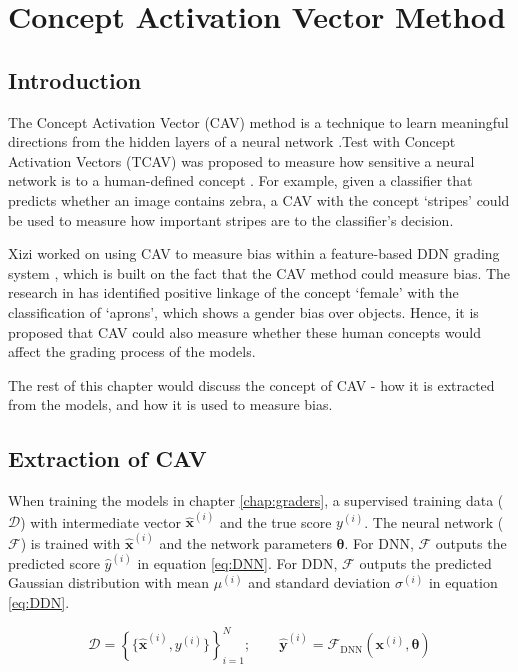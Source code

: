 \chapter{Concept Activation Vector Method} \label{chap:cav}

\section{Introduction}
The Concept Activation Vector (CAV) method is a technique to learn meaningful directions from the hidden layers of a neural network \cite{cav_def}.Test with Concept Activation Vectors (TCAV)  was proposed to measure how sensitive a neural network is to a human-defined concept \cite{tcav}. For example, given a classifier that predicts whether an image contains zebra, a CAV with the concept `stripes' could be used to measure how important stripes are to the classifier's decision.

Xizi worked on using CAV to measure bias within a feature-based DDN grading system \cite{feature_bias}, which is built on the fact that the CAV method could measure bias. The research in \cite{tcav} has identified positive linkage of the concept `female' with the classification of `aprons', which shows a gender bias over objects. Hence, it is proposed that CAV could also measure whether these human concepts would affect the grading process of the models.

The rest of this chapter would discuss the concept of CAV - how it is extracted from the models, and how it is used to measure bias.

\section{Extraction of CAV} \label{sec:cav_extraction}
When training the models in chapter \ref{chap:graders}, a supervised training data ($\mathcal{D}$) with intermediate vector $\mathbf{\hat{x}}^{(i)}$ and the true score $y^{(i)}$. The neural network ($\mathcal{F}$) is trained with $\mathbf{\hat{x}}^{(i)}$ and the network parameters $\boldsymbol{\theta}$. For DNN, $\mathcal{F}$ outputs the predicted score $\hat{y}^{(i)}$ in equation \ref{eq:DNN}. For DDN, $\mathcal{F}$ outputs the predicted Gaussian distribution with mean $\mu^{(i)}$ and standard deviation $\sigma^{(i)}$ in equation \ref{eq:DDN}.

\begin{equation} \label{eq:DNN}
    \mathcal{D} = \left\{\{\mathbf{\hat{x}}^{(i)},y^{(i)}\}\right\}_{i=1}^{N}; \qquad \mathbf{\hat{y}}^{(i)} = \mathcal{F}_{\text{DNN}}(\mathbf{x}^{(i)}, \boldsymbol{\theta})
\end{equation}

